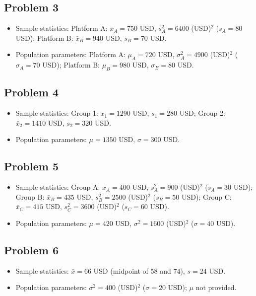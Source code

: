 \subsection*{Problem 3}
\begin{itemize}
    \item Sample statistics: Platform A: $\bar{x}_A=750$ USD, $s_A^2=6400$ (USD)$^2$ ($s_A=80$ USD); Platform B: $\bar{x}_B=940$ USD, $s_B=70$ USD.
    \item Population parameters: Platform A: $\mu_A=720$ USD, $\sigma_A^2=4900$ (USD)$^2$ ($\sigma_A=70$ USD); Platform B: $\mu_B=980$ USD, $\sigma_B=80$ USD.
\end{itemize}

\subsection*{Problem 4}
\begin{itemize}
    \item Sample statistics: Group 1: $\bar{x}_1=1290$ USD, $s_1=280$ USD; Group 2: $\bar{x}_2=1410$ USD, $s_2=320$ USD.
    \item Population parameters: $\mu=1350$ USD, $\sigma=300$ USD.
\end{itemize}

\subsection*{Problem 5}
\begin{itemize}
    \item Sample statistics: Group A: $\bar{x}_A=400$ USD, $s_A^2=900$ (USD)$^2$ ($s_A=30$ USD); Group B: $\bar{x}_B=435$ USD, $s_B^2=2500$ (USD)$^2$ ($s_B=50$ USD); Group C: $\bar{x}_C=415$ USD, $s_C^2=3600$ (USD)$^2$ ($s_C=60$ USD).
    \item Population parameters: $\mu=420$ USD, $\sigma^2=1600$ (USD)$^2$ ($\sigma=40$ USD).
\end{itemize}

\subsection*{Problem 6}
\begin{itemize}
    \item Sample statistics: $\bar{x}=66$ USD (midpoint of 58 and 74), $s=24$ USD.
    \item Population parameters: $\sigma^2=400$ (USD)$^2$ ($\sigma=20$ USD); $\mu$ not provided.
\end{itemize}

